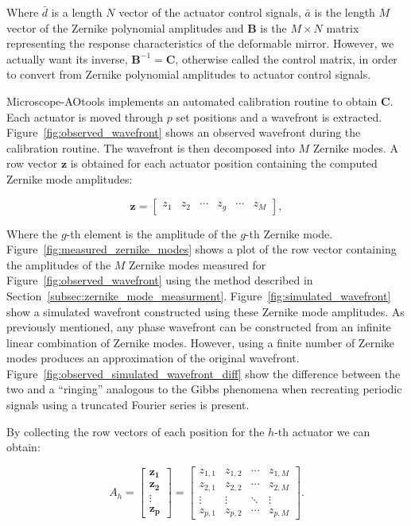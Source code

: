 Where $\bar{d}$ is a length $N$ vector of the actuator control signals, 
$\bar{a}$ is the length $M$ vector of the Zernike polynomial amplitudes and 
$\boldsymbol{B}$ is the $M \times N$ matrix representing the response 
characteristics of the deformable mirror. However, we actually want its 
inverse, $\boldsymbol{B}^{-1} =\boldsymbol{C}$, otherwise called the control 
matrix, in order to convert from Zernike polynomial amplitudes to actuator 
control signals.

Microscope-AOtools implements an automated calibration routine to obtain 
$\boldsymbol{C}$. Each actuator is moved through $p$ set positions and a 
wavefront is extracted. Figure~\ref{fig:observed_wavefront} shows an 
observed wavefront during the calibration routine. The wavefront is then 
decomposed into $M$ Zernike modes\cite{townson2019aotools}. A row vector 
$\boldsymbol{z}$ is obtained for each actuator position containing the 
computed Zernike mode amplitudes:

\begin{equation}\label{eq:zernike_amp}
\boldsymbol{z} = 
\begin{bmatrix}
z_{1} & z_{2} & \cdots & z_{g} & \cdots & z_{M}
\end{bmatrix},
\end{equation}

Where the $g$-th element is the amplitude of the $g$-th
Zernike mode. Figure~\ref{fig:measured_zernike_modes} shows
a plot of the row vector containing the amplitudes of the 
$M$ Zernike modes measured for Figure~\ref{fig:observed_wavefront} using the 
method described in Section~\ref{subsec:zernike_mode_measurment}.
Figure~\ref{fig:simulated_wavefront} show a simulated wavefront 
constructed using these Zernike mode amplitudes. As previously 
mentioned, any phase wavefront can be constructed from an 
infinite linear combination of Zernike modes\cite{noll1976zernike}. 
However, using a finite number of Zernike modes produces an 
approximation of the original wavefront. 
Figure~\ref{fig:observed_simulated_wavefront_diff} show the
difference between the two and a ``ringing'' analogous to the 
Gibbs phenomena when recreating periodic signals using a
truncated Fourier series is present\cite{weisstein2003gibbs}.

By collecting the row vectors of each position
for the $h$-th actuator we can obtain:

\begin{equation}\label{eq:zernike_amp_actuator}
A_h = 
\begin{bmatrix}
\boldsymbol{z_{1}}\\
\boldsymbol{z_{2}}\\
\vdots\\
\boldsymbol{z_{p}} 
\end{bmatrix}
=
\begin{bmatrix}
z_{1,1} & z_{1,2} & \cdots & z_{1,M} \\
z_{2,1} & z_{2,2} & \cdots & z_{2,M} \\
\vdots  & \vdots  & \ddots & \vdots  \\
z_{p,1} & z_{p,2} & \cdots & z_{p,M} 
\end{bmatrix}.
\end{equation}

